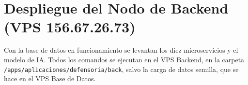 \section{Despliegue del Nodo de Backend (VPS 156.67.26.73)}\label{cap:06_despliegue_backend}
Con la base de datos en funcionamiento se levantan los diez microservicios y el modelo de IA. Todos los comandos se ejecutan en el VPS Backend, en la carpeta \nolinkurl{/apps/aplicaciones/defensoria/back}, salvo la carga de datos semilla, que se hace en el VPS Base de Datos.






